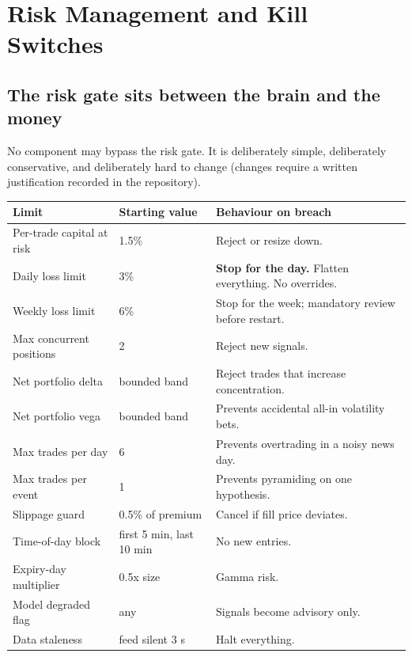 \chapter{Risk Management and Kill Switches}
\label{ch:risk}

\section{The risk gate sits between the brain and the money}

No component may bypass the risk gate. It is deliberately simple, deliberately
conservative, and deliberately hard to change (changes require a written
justification recorded in the repository).

\begin{longtable}{@{}p{4.4cm}p{3.0cm}p{7.0cm}@{}}
\toprule
\textbf{Limit} & \textbf{Starting value} & \textbf{Behaviour on breach}\\
\midrule
Per-trade capital at risk & 1.5\% & Reject or resize down.\\
Daily loss limit & 3\% & \textbf{Stop for the day.} Flatten everything. No
overrides.\\
Weekly loss limit & 6\% & Stop for the week; mandatory review before restart.\\
Max concurrent positions & 2 & Reject new signals.\\
Net portfolio delta & bounded band & Reject trades that increase concentration.\\
Net portfolio vega & bounded band & Prevents accidental all-in volatility bets.\\
Max trades per day & 6 & Prevents overtrading in a noisy news day.\\
Max trades per event & 1 & Prevents pyramiding on one hypothesis.\\
Slippage guard & 0.5\% of premium & Cancel if fill price deviates.\\
Time-of-day block & first 5 min, last 10 min & No new entries.\\
Expiry-day multiplier & 0.5x size & Gamma risk.\\
Model degraded flag & any & Signals become advisory only.\\
Data staleness & feed silent 3 s & Halt everything.\\
\bottomrule
\end{longtable}

